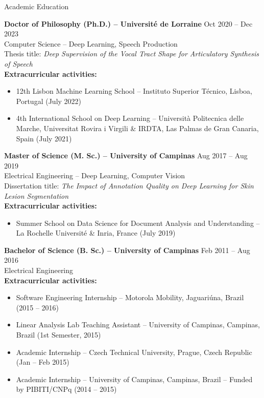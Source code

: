 \documentclass{config/resume} %
\begin{document}
\begin{rSection}{Academic Education}

{\bf Doctor of Philosophy (Ph.D.) -- Université de Lorraine} \hfill {Oct 2020 -- Dec 2023} \\
Computer Science -- Deep Learning, Speech Production \smallskip \\
Thesis title: \textit{Deep Supervision of the Vocal Tract Shape for Articulatory Synthesis of Speech} \smallskip \\
\textbf{Extracurricular activities:}
\begin{itemize}
    \item 12th Lisbon Machine Learning School -- Instituto Superior Técnico, Lisboa, Portugal (July 2022)
    \item 4th International School on Deep Learning -- Università Politecnica delle Marche, Universitat Rovira i Virgili \& IRDTA, Las Palmas de Gran Canaria, Spain (July 2021)
\end{itemize}

{\bf Master of Science (M. Sc.) -- University of Campinas} \hfill {Aug 2017 -- Aug 2019} \\
Electrical Engineering -- Deep Learning, Computer Vision \smallskip \\
Dissertation title: \textit{The Impact of Annotation Quality on Deep Learning for Skin Lesion Segmentation} \smallskip \\
\textbf{Extracurricular activities:}
\begin{itemize}
    \item Summer School on Data Science for Document Analysis and Understanding -- La Rochelle Université \& Inria, France (July 2019)
\end{itemize}

{\bf Bachelor of Science (B. Sc.) -- University of Campinas} \hfill {Feb 2011 -- Aug 2016} \\
Electrical Engineering \smallskip \\
\textbf{Extracurricular activities:}
\begin{itemize}
    \item Software Engineering Internship -- Motorola Mobility, Jaguariúna, Brazil (2015 -- 2016)
    \item Linear Analysis Lab Teaching Assistant -- University of Campinas, Campinas, Brazil (1st Semester, 2015)
    \item Academic Internship -- Czech Technical University, Prague, Czech Republic (Jan -- Feb 2015)
    \item Academic Internship -- University of Campinas, Campinas, Brazil -- Funded by PIBITI/CNPq (2014 -- 2015)
\end{itemize}


\end{rSection}
\end{document}
